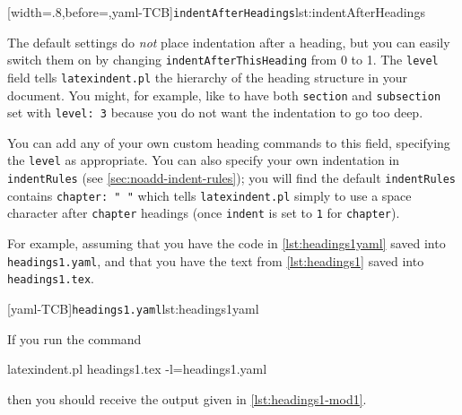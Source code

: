 	[width=.8\linewidth,before=\centering,yaml-TCB]{\texttt{indentAfterHeadings}}{lst:indentAfterHeadings}

	The default settings do \emph{not} place indentation after a heading, but you can easily
	switch them on by changing \texttt{indentAfterThisHeading} from 0 to 1. The
	\texttt{level} field tells \texttt{latexindent.pl} the hierarchy of the heading structure
	in your document. You might, for example, like to have both \texttt{section} and
	\texttt{subsection} set with \texttt{level: 3} because you do not want the indentation to
	go too deep.

	You can add any of your own custom heading commands to this field, specifying the
	\texttt{level} as appropriate. You can also specify your own indentation in
	\texttt{indentRules} (see \vref{sec:noadd-indent-rules}); you will find the default
	\texttt{indentRules} contains \lstinline!chapter: " "! which tells
	\texttt{latexindent.pl} simply to use a space character after \texttt{chapter} headings
	(once \texttt{indent} is set to \texttt{1} for \texttt{chapter}).

	For example, assuming that you have the code in \cref{lst:headings1yaml} saved into
	\texttt{headings1.yaml}, and that you have the text from \cref{lst:headings1} saved into
	\texttt{headings1.tex}.

	\begin{cmhtcbraster}
		[yaml-TCB]{\texttt{headings1.yaml}}{lst:headings1yaml}
	\end{cmhtcbraster}

	If you run the command 
	\begin{commandshell}
latexindent.pl headings1.tex -l=headings1.yaml
\end{commandshell}
	then you should receive the output given in \cref{lst:headings1-mod1}.

	\begin{minipage}{.45\textwidth}
	\end{minipage}%
	\hfill
	\begin{minipage}{.45\textwidth}
	\end{minipage}

